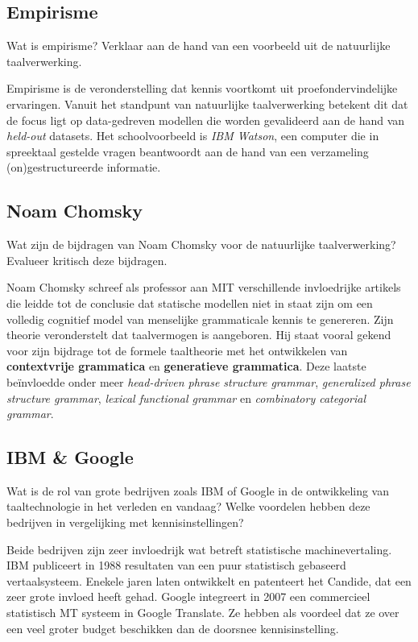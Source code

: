 \documentclass[../main.tex]{subfiles}
\begin{document}
\subsection{Empirisme}
\begin{question}
Wat is empirisme? Verklaar aan de hand van een voorbeeld uit de natuurlijke taalverwerking.
\end{question}

\begin{solution}
Empirisme is de veronderstelling dat kennis voortkomt uit proefondervindelijke ervaringen.
Vanuit het standpunt van natuurlijke taalverwerking betekent dit dat de focus ligt op data-gedreven modellen die worden gevalideerd aan de hand van \emph{held-out} datasets.
Het schoolvoorbeeld is \emph{IBM Watson}, een computer die in spreektaal gestelde vragen beantwoordt aan de hand van een verzameling (on)gestructureerde informatie.
\end{solution}

\subsection{Noam Chomsky}
\begin{question}
Wat zijn de bijdragen van Noam Chomsky voor de natuurlijke taalverwerking?
Evalueer kritisch deze bijdragen.
\end{question}

\begin{solution}
Noam Chomsky schreef als professor aan MIT verschillende invloedrijke artikels die leidde tot de conclusie dat statische modellen niet in staat zijn om een volledig cognitief model van menselijke grammaticale kennis te genereren.
Zijn theorie veronderstelt dat taalvermogen is aangeboren.
Hij staat vooral gekend voor zijn bijdrage tot de formele taaltheorie met het ontwikkelen van \textbf{contextvrije grammatica} en \textbf{generatieve grammatica}. Deze laatste beïnvloedde onder meer \emph{head-driven phrase structure grammar}, \emph{generalized phrase structure grammar}, \emph{lexical functional grammar} en \emph{combinatory categorial grammar}.
\end{solution}

\subsection{IBM \& Google}
\begin{question}
Wat is de rol van grote bedrijven zoals IBM of Google in de ontwikkeling van taaltechnologie in het verleden en vandaag?
Welke voordelen hebben deze bedrijven in vergelijking met kennisinstellingen?
\end{question}
\begin{solution}
Beide bedrijven zijn zeer invloedrijk wat betreft statistische machinevertaling.
IBM publiceert in 1988 resultaten van een puur statistisch gebaseerd vertaalsysteem. Enekele jaren laten ontwikkelt en patenteert het Candide, dat een zeer grote invloed heeft gehad.
Google integreert in 2007 een commercieel statistisch MT systeem in Google Translate.
Ze hebben als voordeel dat ze over een veel groter budget beschikken dan de doorsnee kennisinstelling.
\end{solution}
\end{document}
